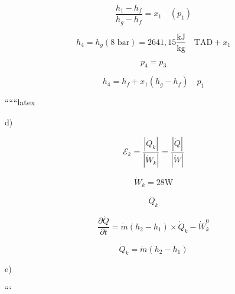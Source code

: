 \[
\frac{h_1 - h_f}{h_g - h_f} = x_1 \quad (p_1)
\]

\[
h_4 = h_g (8 \text{ bar}) = 2641,15 \frac{\text{kJ}}{\text{kg}} \quad \text{TAD} + x_1
\]

\[
p_4 = p_3
\]

\[
h_4 = h_f + x_1 (h_g - h_f) \quad p_1
\]

``````latex

d)

\[
\mathcal{E}_k = \frac{|\dot{Q}_k|}{|\dot{W}_k|} = \frac{|\dot{Q}|}{|\dot{W}|}
\]

\[
\dot{W}_k = 28 \text{W}
\]

\[
\dot{Q}_k
\]

\[
\frac{\partial \dot{Q}}{\partial t} = \dot{m}(h_2 - h_1) \times \dot{Q}_k - \dot{W}_k^0
\]

\[
\dot{Q}_k = \dot{m}(h_2 - h_1)
\]

e)

```